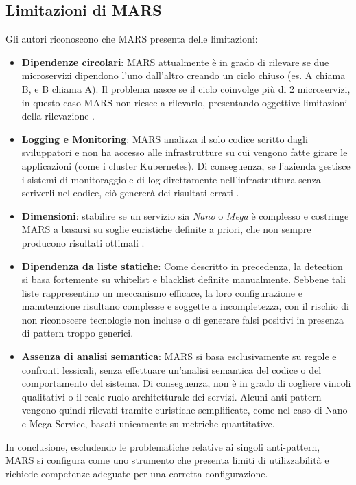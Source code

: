 \subsection{Limitazioni di MARS}
Gli autori riconoscono che MARS presenta delle limitazioni:
\begin{itemize}
    \item \textbf{Dipendenze circolari}: MARS attualmente è in grado di rilevare se due microservizi dipendono l'uno dall'altro creando un ciclo chiuso (es. A chiama B, e B chiama A). Il problema nasce se il ciclo coinvolge più di 2 microservizi, in questo caso MARS non riesce a rilevarlo, presentando oggettive limitazioni della rilevazione \cite{MARS}.
    \item  \textbf{Logging e Monitoring}: MARS analizza il solo codice scritto dagli sviluppatori e non ha accesso alle infrastrutture su cui vengono fatte girare le applicazioni (come i cluster Kubernetes). Di conseguenza, se l'azienda gestisce i sistemi di monitoraggio e di log direttamente nell'infrastruttura senza scriverli nel codice, ciò genererà dei risultati errati \cite{MARS}.
    \item \textbf{Dimensioni}: stabilire se un servizio sia \textit{Nano} o \textit{Mega} è complesso e costringe MARS a basarsi su soglie euristiche definite a priori, che non sempre producono risultati ottimali \cite{MARS}.
    \item \textbf{Dipendenza da liste statiche}: 
    Come descritto in precedenza, la detection si basa fortemente su whitelist e blacklist
    definite manualmente. Sebbene tali liste rappresentino un meccanismo efficace,
    la loro configurazione e manutenzione risultano complesse e soggette a incompletezza,
    con il rischio di non riconoscere tecnologie non incluse o di generare falsi positivi
    in presenza di pattern troppo generici. 
    \item \textbf{Assenza di analisi semantica}: MARS si basa esclusivamente su regole e confronti lessicali, senza effettuare un'analisi semantica del codice o del comportamento del sistema. Di conseguenza,
    non è in grado di cogliere vincoli qualitativi o il reale ruolo architetturale
    dei servizi. Alcuni anti-pattern vengono quindi rilevati tramite euristiche
    semplificate, come nel caso di Nano e Mega Service, basati unicamente su metriche
    quantitative.

\end{itemize}

In conclusione, escludendo le problematiche relative ai singoli anti-pattern, MARS si configura come uno strumento che presenta limiti di utilizzabilità e richiede competenze adeguate per una corretta configurazione.

